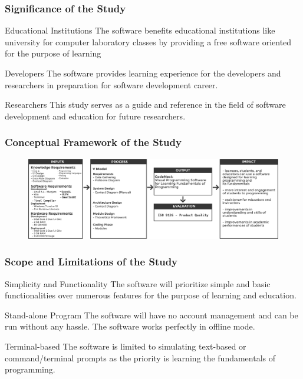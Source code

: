 \documentclass{beamer}
\begin{document}
\begin{frame}
	\frametitle{Significance of the Study}
	\begin{block}{Educational Institutions}
		The software benefits educational institutions like university for computer
		laboratory classes by providing a free software oriented for the purpose of
		learning
	\end{block}

	\begin{block}{Developers}
		The software provides learning experience for the developers and researchers
		in preparation for software development career.
	\end{block}

	\begin{block}{Researchers}
		This study serves as a guide and reference in the field of software
		development and education for future researchers.
	\end{block}
\end{frame}

\begin{frame}
	\frametitle{Conceptual Framework of the Study}
	\begin{figure}
		\includegraphics[width=1\textwidth]{figures/conceptual_framework.png}
	\end{figure}
\end{frame}

\begin{frame}
	\frametitle{Scope and Limitations of the Study}
	\begin{block}{Simplicity and Functionality}
		The software will prioritize simple and basic functionalities over numerous
		features for the purpose of learning and education.
	\end{block}
	\begin{block}{Stand-alone Program}
		The software will have no account management and can be run without any
		hassle. The software works perfectly in offline mode.
	\end{block}
	\begin{block}{Terminal-based}
		The software is limited to simulating text-based or command/terminal
		prompts as the priority is learning the fundamentals of programming.
	\end{block}
\end{frame}
\end{document}
